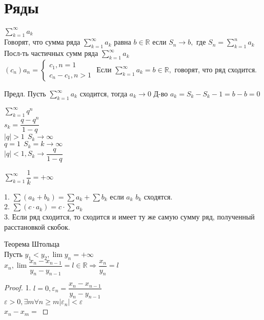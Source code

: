 \section{Ряды}

\begin{definition}
	$ \sum_{k=1}^{\infty} a_k $\\
	Говорят, что сумма ряда $  \sum_{k=1}^{\infty} a_k $ равна  $ b \in \mathbb{R} $ если $ S_n \rightarrow b, $ где $ S_n =  \sum_{k=1}^{n} a_k$
	Посл-ть частичных сумм ряда $  \sum_{k=1}^{\infty} a_k$ \\
	$ (c_n) a_n = \left\{ \begin{matrix}
		c_1, n = 1 \\
		c_n - c_1, n > 1 
	\end{matrix} \right. $ 
	Если $  \sum_{k=1}^{\infty} a_k = b \in \mathbb{R}, $ говорят, что ряд сходится.
\end{definition}
Предл. Пусть $  \sum_{k=1}^{\infty} a_k $ сходится, тогда $ a_k \rightarrow 0 $ 
Д-во $ a_k = S_k - S_k-1 = b - b = 0$\\
\begin{example}
	 $ \sum_{k=1}^{\infty} q^n $\\
	 $ s_k = \dfrac{q - q^n}{1 - q} $ \\
	 $ |q | > 1\ \ S_k \rightarrow \infty $ \\
	 $ q = 1 \ \ S_k = k \rightarrow \infty $ \\
	 $ | q | < 1, S_k \rightarrow \dfrac{q}{1- q} $ \\
\end{example}
\begin{example}
	$  \sum_{k=1}^{\infty} \dfrac{1}{k} = +\infty $ \\
\end{example}
\begin{properties}
	1. $ \sum(a_k + b_k) = \sum a_k + \sum b_k $ если $a_k $ $ b_k $ сходятся.\\
	2. $ \sum (c \cdot a_k ) = c \cdot \sum a_k $ \\
	3. Если ряд сходится, то сходится и имеет ту же самую сумму ряд, полученный расстановкой скобок. \\
	
\end{properties}
\begin{theorem} Теорема Штольца \\
	Пусть $ y_1 < y_2, \lim y_n =  +\infty $ \\
	$ x_n, \lim \dfrac{x_n - x_{n-1}}{y_n - y_{n-1}} = l \in \mathbb{R} \Rightarrow \dfrac{x_n}{y_n} = l $
	\begin{proof}
		1. $ l = 0, \varepsilon_n = \dfrac{x_n - x_{n-1}}{y_n - y_{n-1}} $ \\
		$ \varepsilon > 0, \exists m \forall n \geq m |\varepsilon_n | < \varepsilon $ \\
		$ x_n - x_m = $
	\end{proof}
\end{theorem}
